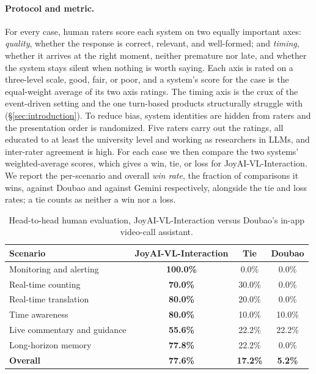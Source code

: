 \documentclass{llmxive}
\providecommand{\arraystretch}{1.3}
\begin{document}
\paragraph{\textbf{Protocol and metric.}} For every case, human raters score each system on two equally important axes: \textit{quality}, whether the response is correct, relevant, and well-formed; and \textit{timing}, whether it arrives at the right moment, neither premature nor late, and whether the system stays silent when nothing is worth saying. Each axis is rated on a three-level scale, good, fair, or poor, and a system's score for the case is the equal-weight average of its two axis ratings. The timing axis is the crux of the event-driven setting and the one turn-based products structurally struggle with (\S\ref{sec:introduction}). To reduce bias, system identities are hidden from raters and the presentation order is randomized. Five raters carry out the ratings, all educated to at least the university level and working as researchers in LLMs, and inter-rater agreement is high. For each case we then compare the two systems' weighted-average scores, which gives a win, tie, or loss for JoyAI-VL-Interaction. We report the per-scenario and overall \textit{win rate}, the fraction of comparisons it wins, against Doubao and against Gemini respectively, alongside the tie and loss rates; a tie counts as neither a win nor a loss.



\begin{table}[!htbp]
\centering
\renewcommand{\arraystretch}{1.3}
\begin{tabular}{lccc}
\toprule
\textbf{Scenario} & \textbf{JoyAI-VL-Interaction} & \textbf{Tie} & \textbf{Doubao} \\
\midrule
Monitoring and alerting      & \textbf{100.0\%} & 0.0\%  & 0.0\%  \\
Real-time counting                & \textbf{70.0\%}  & 30.0\% & 0.0\%  \\
Real-time translation        & \textbf{80.0\%}  & 20.0\% & 0.0\%  \\
Time awareness               & \textbf{80.0\%}  & 10.0\% & 10.0\% \\
Live commentary and guidance & \textbf{55.6\%}  & 22.2\% & 22.2\% \\
Long-horizon memory          & \textbf{77.8\%}  & 22.2\% & 0.0\%  \\
\midrule
\textbf{Overall}             & \textbf{77.6\%}  & \textbf{17.2\%} & \textbf{5.2\%} \\
\bottomrule
\end{tabular}
\caption{Head-to-head human evaluation, JoyAI-VL-Interaction versus Doubao's in-app video-call assistant.}
\end{table}
\end{document}

